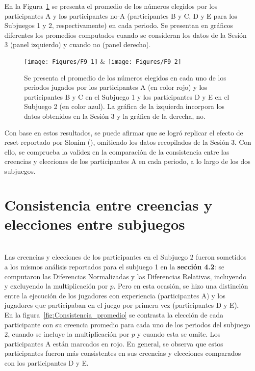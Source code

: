En la Figura~\ref{fig:ParticipantesA_promedio} se presenta el promedio de los números elegidos por los participantes A y los participantes no-A (participantes B y C, D y E para los Subjuegos 1 y 2, respectivamente) en cada periodo. Se presentan en gráficos diferentes los promedios computados cuando se consideran los datos de la Sesión 3 (panel izquierdo) y cuando no (panel derecho).\\
  
\begin{figure}[h]
\centering
\texttt{[image: Figures/F9\_1]} & \texttt{[image: Figures/F9\_2]} 
\decoRule
\caption[Promedio de los números elegidos por los participantes A y no-A en cada uno de los periodos jugados]{Se presenta el promedio de los números elegidos en cada uno de los periodos jugados por los participantes A (en color rojo) y los participantes B y C en el Subjuego 1 y los participantes D y E en el Subjuego 2 (en color azul). La gráfica de la izquierda incorpora los datos obtenidos en la Sesión 3 y la gráfica de la derecha, no.}
\label{fig:ParticipantesA_promedio}
\end{figure}  

Con base en estos resultados, se puede afirmar que se logró replicar el efecto de reset reportado por Slonim (\citeyear{Slonim}), omitiendo los datos recopilados de la Sesión 3. Con ello, se comprueba la validez en la comparación de la consistencia entre las creencias y elecciones de los participantes A en cada periodo, a lo largo de los dos subjuegos.\\

\section{Consistencia entre creencias y elecciones entre subjuegos}\\

Las creencias y elecciones de los participantes en el Subjuego 2 fueron sometidos a los mismos análisis reportados para el subjuego 1 en la \textbf{sección 4.2}: se computaron las Diferencias Normalizadas y las Diferencias Relativas, incluyendo y excluyendo la multiplicación por $p$. Pero en esta ocasión, se hizo una distinción entre la ejecución de los jugadores con experiencia (participantes A) y los jugadores que participaban en el juego por primera vez (participantes D y E).\\

En la figura~\ref{fig:Consistencia_promedio} se contrasta la elección de cada participante con su creencia promedio para cada uno de los periodos del subjuego 2, cuando se incluye la multiplicación por $p$ y cuando esta se omite. Los participantes A están marcados en rojo. En general, se observa que estos participantes fueron más consistentes en sus creencias y elecciones comparados con los participantes D y E.\\

